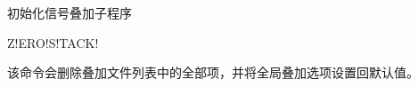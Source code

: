 \label{sss:zerostack}

初始化信号叠加子程序

\begin{SACSTX}
Z!ERO!S!TACK!
\end{SACSTX}

该命令会删除叠加文件列表中的全部项，并将全局叠加选项设置回默认值。
